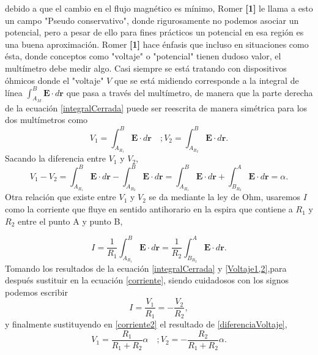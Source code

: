 \documentclass[a0,portrait]{a0poster}
\begin{document}
\begin{multicols}{2}
debido a que el cambio en el flujo magnético es mínimo, Romer \textbf{[{1}]}  le llama a esto un campo "Pseudo conservativo", donde rigurosamente no podemos asociar un potencial, pero a pesar de ello para fines prácticos un potencial en esa región es una buena aproximación. Romer \textbf{[{1}]} hace énfasis que incluso  en situaciones como ésta, donde conceptos como "voltaje"  o "potencial" tienen dudoso valor, el multímetro debe medir algo. Casi siempre se está tratando con dispositivos óhmicos donde el "voltaje" $V$ que se está midiendo corresponde a la integral de línea $\int_{A_{M}}^{B} \mathbf{E} \cdot d\mathbf{r}$ que pasa a través del multímetro, de manera que la parte derecha de la ecuación \ref{integralCerrada} puede ser reescrita de manera simétrica para los dos multímetros como
\begin{equation}
    V_1 = \int_{A_{R_1}}^{B} \mathbf{E} \cdot d\mathbf{r} \quad ; V_2=\int_{A_{R_2}}^{B} \mathbf{E} \cdot d\mathbf{r}.
    \label{Voltaje1,2}
\end{equation}
Sacando la diferencia entre $V_1$ y $V_2$,
\begin{equation}
    V_1 - V_2 =\int_{A_{R_1}}^{B} \mathbf{E} \cdot d\mathbf{r} - \int_{A_{R_2}}^{B} \mathbf{E} \cdot d\mathbf{r} = \int_{A_{R_1}}^{B} \mathbf{E} \cdot d\mathbf{r} + \int_{B_{R_2}}^{A} \mathbf{E} \cdot d\mathbf{r} = \alpha.
    \label{diferenciaVoltaje}
\end{equation}
Otra relación que existe entre $V_1$ y $V_2$ se da mediante la ley de Ohm, usaremos $I$ como la corriente que fluye en sentido antihorario en la espira que contiene a $R_1$ y $R_2$ entre el punto A y punto B,

\begin{equation}
    I = \frac{1}{R_1} \int_{A_{R_1}}^{B} \mathbf{E} \cdot d\mathbf{r} =  \frac{1}{R_2}\int_{B_{R_2}}^{A} \mathbf{E} \cdot d\mathbf{r}.
    \label{corriente}
\end{equation}
Tomando los resultados de la ecuación \ref{integralCerrada} y \ref{Voltaje1,2},para después sustituir en la ecuación \ref{corriente}, siendo cuidadosos con los signos podemos escribir
\begin{equation}
    I = \frac{V_1}{R_1} = -\frac{V_2}{R_2}, 
    \label{corriente2}
\end{equation}
y finalmente sustituyendo en \ref{corriente2} el resultado de \ref{diferenciaVoltaje},
\begin{equation}
    V_1 = \frac{R_1}{R_1 + R_2} \alpha \quad ; V_2=-\frac{R_2}{R_1 + R_2} \alpha.
    \label{eq:}
\end{equation}


\end{multicols}
\end{document}
